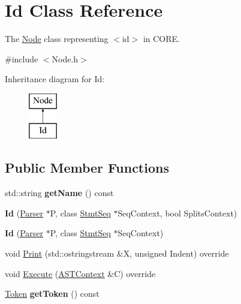 \hypertarget{class_id}{}\section{Id Class Reference}
\label{class_id}


The \mbox{\hyperlink{class_node}{Node}} class representing {\ttfamily $<$id$>$} in C\+O\+RE.  




{\ttfamily \#include $<$Node.\+h$>$}

Inheritance diagram for Id\+:\begin{figure}[H]
\begin{center}
\leavevmode
\includegraphics[height=2.000000cm]{class_id}
\end{center}
\end{figure}
\subsection*{Public Member Functions}
\begin{DoxyCompactItemize}
\item 
\mbox{\label{class_id_a5521a33d05e558cac24488e617192390}} 
std\+::string {\bfseries get\+Name} () const
\item 
\mbox{\label{class_id_ad6afdab42dce9427048dca171a5b10fb}} 
{\bfseries Id} (\mbox{\hyperlink{class_parser}{Parser}} $\ast$P, class \mbox{\hyperlink{class_stmt_seq}{Stmt\+Seq}} $\ast$Seq\+Context, bool Splits\+Context)
\item 
\mbox{\label{class_id_a0ce874b7d6cc3d31d22e4e06c7c09f98}} 
{\bfseries Id} (\mbox{\hyperlink{class_parser}{Parser}} $\ast$P, class \mbox{\hyperlink{class_stmt_seq}{Stmt\+Seq}} $\ast$Seq\+Context)
\item 
void \mbox{\hyperlink{class_id_a79e18030494873748efcaf6ea530a35f}{Print}} (std\+::ostringstream \&X, unsigned Indent) override
\item 
void \mbox{\hyperlink{class_id_a3fc54b723e5c48d0f575e08b4e54caef}{Execute}} (\mbox{\hyperlink{class_a_s_t_context}{A\+S\+T\+Context}} \&C) override
\item 
\mbox{\label{class_id_a796566e5e221c521461166667b5fa9e5}} 
\mbox{\hyperlink{class_token}{Token}} {\bfseries get\+Token} () const
\end{DoxyCompactItemize}
